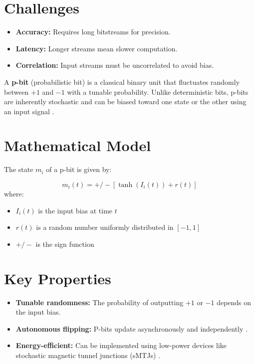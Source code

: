\documentclass{article}
\begin{document}
\section{Challenges}
\begin{itemize}
  \item \textbf{Accuracy:} Requires long bitstreams for precision.
  \item \textbf{Latency:} Longer streams mean slower computation.
  \item \textbf{Correlation:} Input streams must be uncorrelated to avoid bias.
\end{itemize}

A \textbf{p-bit} (probabilistic bit) is a classical binary unit that fluctuates randomly between $+1$ and $-1$ with a tunable probability. Unlike deterministic bits, p-bits are inherently stochastic and can be biased toward one state or the other using an input signal \cite{camsari2017stochastic}.

\section{Mathematical Model}
The state $m_i$ of a p-bit is given by:

\begin{equation}
	m_i(t) = +/- [\tanh(I_i(t)) + r(t)]
\end{equation}
where:
\begin{itemize}
  \item $I_i(t)$ is the input bias at time $t$
  \item $r(t)$ is a random number uniformly distributed in $[-1, 1]$
  \item $+/-$ is the sign function
\end{itemize}

\section{Key Properties}
\begin{itemize}
  \item \textbf{Tunable randomness:} The probability of outputting $+1$ or $-1$ depends on the input bias.
  \item \textbf{Autonomous flipping:} P-bits update asynchronously and independently \cite{camsari2019petaflips}.
  \item \textbf{Energy-efficient:} Can be implemented using low-power devices like stochastic magnetic tunnel junctions (sMTJs) \cite{camsari2023fullstack}.
\end{itemize}
\end{document}
